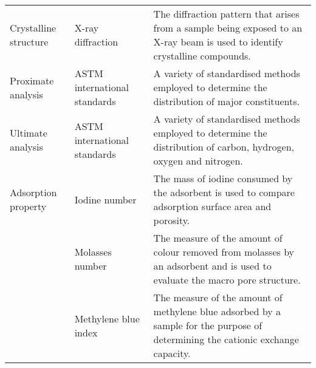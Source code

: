 \begin{tabular}{>{\raggedright\arraybackslash}p{3cm}>{\raggedright\arraybackslash}p{4cm}p{5cm}}
Crystalline structure & X-ray diffraction & The diffraction pattern that arises from a sample being exposed to an X-ray beam is used to identify crystalline compounds. \\ 
Proximate analysis & ASTM international standards & A variety of standardised methods employed to determine the distribution of major constituents. \\ 
Ultimate analysis  & ASTM international standards & A variety of standardised methods employed to determine the distribution of carbon, hydrogen, oxygen and nitrogen. \\ 
Adsorption property & Iodine number & The mass of iodine consumed by the adsorbent is used to compare adsorption surface area and porosity. \\ 
 & Molasses number & The measure of the amount of colour removed from molasses by an adsorbent and is used to evaluate the macro pore structure. \\ 
 & Methylene blue index & The measure of the amount of methylene blue adsorbed by a sample for the purpose of determining the cationic exchange capacity. \\
 \bottomrule 
\end{tabular}
